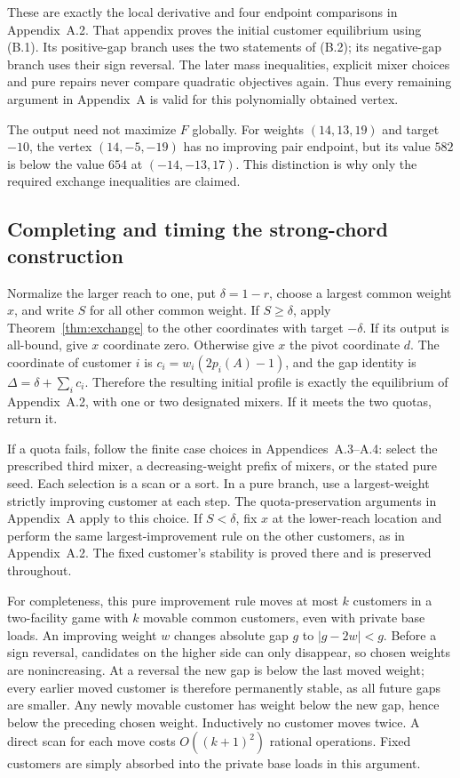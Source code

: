 \documentclass[11pt,a4paper]{article}
\begin{document}
These are exactly the local derivative and four endpoint comparisons in
Appendix~A.2. That appendix proves the initial customer equilibrium using
(B.1). Its positive-gap branch uses the two statements of (B.2); its
negative-gap branch uses their sign reversal. The later mass inequalities,
explicit mixer choices and pure repairs never compare quadratic objectives
again. Thus every remaining argument in Appendix~A is valid for this
polynomially obtained vertex.

The output need not maximize $F$ globally. For weights $(14,13,19)$ and
target $-10$, the vertex $(14,-5,-19)$ has no improving pair endpoint,
but its value $582$ is below the value $654$ at $(-14,-13,17)$.
This distinction is why only the required exchange inequalities are claimed.

\subsection{Completing and timing the strong-chord construction}
Normalize the larger reach to one, put $\delta=1-r$, choose a largest
common weight $x$, and write $S$ for all other common weight. If
$S\ge\delta$, apply Theorem~\ref{thm:exchange} to the other coordinates
with target $-\delta$. If its output is all-bound, give $x$ coordinate
zero. Otherwise give $x$ the pivot coordinate $d$. The coordinate of
customer $i$ is $c_i=w_i(2p_i(A)-1)$, and the gap identity is
$\Delta=\delta+\sum_i c_i$. Therefore the resulting initial profile is
exactly the equilibrium of Appendix~A.2, with one or two designated
mixers. If it meets the two quotas, return it.

If a quota fails, follow the finite case choices in Appendices~A.3--A.4:
select the prescribed third mixer, a decreasing-weight prefix of mixers,
or the stated pure seed. Each selection is a scan or a sort. In a pure
branch, use a largest-weight strictly improving customer at each step.
The quota-preservation arguments in Appendix~A apply to this choice.
If $S<\delta$, fix $x$ at the lower-reach location and perform the same
largest-improvement rule on the other customers, as in Appendix~A.2.
The fixed customer's stability is proved there and is preserved throughout.

For completeness, this pure improvement rule moves at most $k$ customers
in a two-facility game with $k$ movable common customers, even with private
base loads. An improving weight $w$ changes absolute gap $g$ to
$|g-2w|<g$. Before a sign reversal, candidates on the higher side can only
disappear, so chosen weights are nonincreasing. At a reversal the new gap
is below the last moved weight; every earlier moved customer is therefore
permanently stable, as all future gaps are smaller. Any newly movable
customer has weight below the new gap, hence below the preceding chosen
weight. Inductively no customer moves twice. A direct scan for each move
costs $O((k+1)^2)$ rational operations. Fixed customers are simply absorbed
into the private base loads in this argument.
\end{document}
